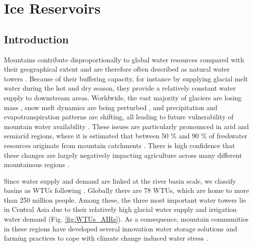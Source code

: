 \chapter{Ice Reservoirs}



\section{Introduction}

Mountains contribute disproportionally to global water resources compared with their geographical extent and are
therefore often described as natural water towers \citep{immerzeelImportanceVulnerabilityWorld2020}. Because of
their buffering capacity, for instance by supplying glacial melt water during the hot and dry season, they
provide a relatively constant water supply to downstream areas. Worldwide, the vast majority of glaciers are
losing mass \citep{zempGlobalGlacierMass2019a}, snow melt dynamics are being perturbed
\citep{mukhopadhyayReevaluationSnowmeltGlacial2015, hammondGlobalSnowZone2018}, and precipitation and
evapotranspiration patterns are shifting, all leading to future vulnerability of mountain water availability
\citep{lutzConsistentIncreaseHigh2014}. These issues are particularly pronounced in arid and semiarid regions,
where it is estimated that between 50 \% and 90 \% of freshwater resources originate from mountain catchments
\citep{mukhopadhyayReevaluationSnowmeltGlacial2015, messerliMountainsWorldVulnerable2004}. There is high
confidence that these changes are largely negatively impacting agriculture across many different mountainous
regions \citep{ipccCrossChapterPaperMountains2022}.  

Since water supply and demand are linked at the river basin scale, we classify basins as \ac{WTUs} following
\citet{immerzeelImportanceVulnerabilityWorld2020}. Globally there are 78 \ac{WTUs}, which are home to more than
250 million people. Among these, the three most important water towers lie in Central Asia due to their
relatively high glacial water supply and irrigation water demand (Fig. \ref{fig:WTUs_AIRs}). As a consequence, mountain communities in these regions have
developed several innovation water storage solutions and farming practices to cope with climate change induced
water stress \citep{labbalTraditionalOasesLadakh2000, nusserIrrigationDevelopmentUpper2012, kreutzmannScarcityOpulenceWater2011, pandeyRockGlacierOasis2022,
ochoa-tocachiPotentialContributionsPreInca2019, monge-salazarEcohydrologyEcosystemServices2022}.

